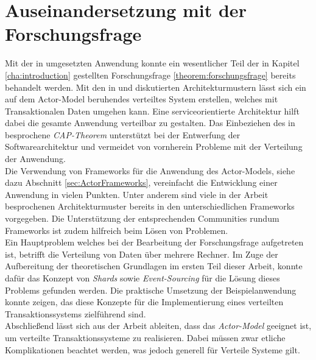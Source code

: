 \section{Auseinandersetzung mit der Forschungsfrage}
Mit der in umgesetzten Anwendung konnte ein wesentlicher Teil der in Kapitel \ref{cha:introduction} gestellten Forschungsfrage \ref{theorem:forschungsfrage} bereits behandelt werden. Mit den in \cite{Vernon2015ReactiveAkka} und \cite{akkaInAction} diskutierten Architekturmustern lässt sich ein auf dem  Actor-Model beruhendes verteiltes System erstellen, welches mit Transaktionalen Daten umgehen kann. Eine serviceorientierte Architektur hilft dabei die gesamte Anwendung verteilbar zu gestalten. 
Das Einbeziehen des in \cite{gilbertPerspectiveCAPTheorem2012} besprochene \textit{CAP-Theorem} unterstützt bei der Entwerfung der Softwarearchitektur und vermeidet von vornherein Probleme mit der Verteilung der Anwendung. \\ 
Die Verwendung von Frameworks für die Anwendung des Actor-Models, siehe dazu Abschnitt \ref{sec:ActorFrameworks}, vereinfacht die Entwicklung einer Anwendung in vielen Punkten. Unter anderem sind viele in der Arbeit besprochenen Architekturmuster bereits in den unterschiedlichen Frameworks vorgegeben. Die Unterstützung der entsprechenden Communities rundum Frameworks ist zudem hilfreich beim Lösen von Problemen. \\
Ein Hauptproblem welches bei der Bearbeitung der Forschungsfrage aufgetreten ist, betrifft die Verteilung von Daten über mehrere Rechner. Im Zuge der Aufbereitung der theoretischen Grundlagen im ersten Teil dieser Arbeit, konnte dafür das Konzept von \textit{Shards} sowie \textit{Event-Sourcing} für die Lösung dieses Problems gefunden werden. Die praktische Umsetzung der Beispielanwendung konnte zeigen, das diese Konzepte für die Implementierung eines verteilten Transaktionssystems zielführend sind. \\
Abschließend lässt sich aus der Arbeit ableiten, dass das \textit{Actor-Model} geeignet ist, um verteilte Transaktionssysteme zu realisieren. Dabei müssen zwar etliche Komplikationen beachtet werden, was jedoch generell für Verteile Systeme gilt.

